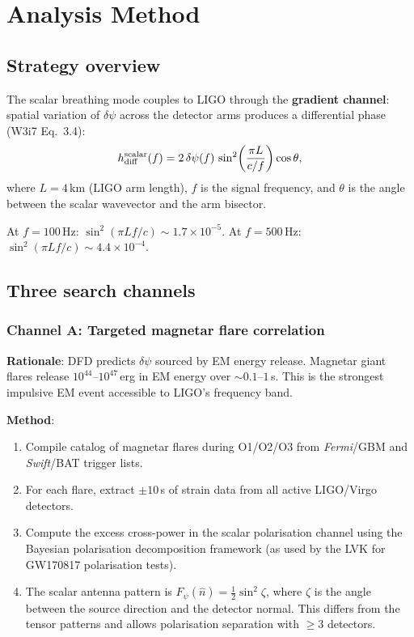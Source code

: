 \documentclass[11pt]{article}
\newcommand{\ee}[1]{\times 10^{#1}}
\newcommand{\dpsi}{\delta\psi}
\begin{document}
\section{Analysis Method}

\subsection{Strategy overview}

The scalar breathing mode couples to LIGO through the \textbf{gradient
channel}: spatial variation of $\dpsi$ across the detector arms produces
a differential phase (W3i7 Eq.~3.4):
\begin{equation}
h_{\rm diff}^{\rm scalar}(f) = 2\,\dpsi(f)\,\sin^2\!\left(
\frac{\pi L}{c/f}\right)\cos\theta,
\label{eq:gradient_coupling}
\end{equation}
where $L = 4\,$km (LIGO arm length), $f$ is the signal frequency,
and $\theta$ is the angle between the scalar wavevector and the arm
bisector.

At $f = 100$\,Hz: $\sin^2(\pi L f/c) \sim 1.7\ee{-5}$.
At $f = 500$\,Hz: $\sin^2(\pi L f/c) \sim 4.4\ee{-4}$.

\subsection{Three search channels}

\subsubsection{Channel A: Targeted magnetar flare correlation}

\textbf{Rationale}: DFD predicts $\dpsi$ sourced by EM energy release.
Magnetar giant flares release $10^{44}$--$10^{47}$\,erg in EM energy
over $\sim 0.1$--$1$\,s. This is the strongest impulsive EM event
accessible to LIGO's frequency band.

\textbf{Method}:
\begin{enumerate}[nosep]
\item Compile catalog of magnetar flares during O1/O2/O3 from
  \textit{Fermi}/GBM and \textit{Swift}/BAT trigger lists.
\item For each flare, extract $\pm 10$\,s of strain data from all
  active LIGO/Virgo detectors.
\item Compute the excess cross-power in the scalar polarisation
  channel using the Bayesian polarisation decomposition framework
  (as used by the LVK for GW170817 polarisation tests).
\item The scalar antenna pattern is $F_\psi(\hat{n}) = \frac{1}{2}\sin^2\zeta$,
  where $\zeta$ is the angle between the source direction and the
  detector normal. This differs from the tensor patterns and allows
  polarisation separation with $\geq 3$ detectors.
\end{enumerate}
\end{document}
